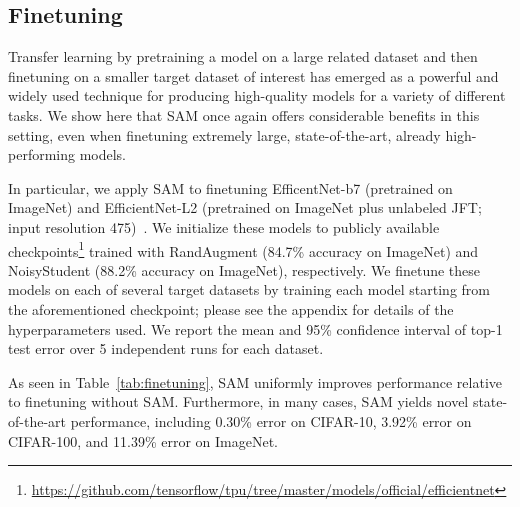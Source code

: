 \documentclass{article} %
\begin{document}
\subsection{Finetuning}

Transfer learning by pretraining a model on a large related dataset and then finetuning on a smaller target dataset of interest has emerged as a powerful and widely used technique for producing high-quality models for a variety of different tasks.  We show here that SAM once again offers considerable benefits in this setting, even when finetuning extremely large, state-of-the-art, already high-performing models.

In particular, we apply SAM to finetuning EfficentNet-b7 (pretrained on ImageNet) and EfficientNet-L2 (pretrained on ImageNet plus unlabeled JFT; input resolution 475)~\citep{efficientnet, 2018arXiv180508974K, gpipe}.  We initialize these models to publicly available checkpoints\footnote{\url{https://github.com/tensorflow/tpu/tree/master/models/official/efficientnet}} trained with RandAugment (84.7\% accuracy on ImageNet) and NoisyStudent (88.2\% accuracy on ImageNet), respectively.  We finetune these models on each of several target datasets by training each model starting from the aforementioned checkpoint; please see the appendix for details of the hyperparameters used.  We report the mean and 95\% confidence interval of top-1 test error over 5 independent runs for each dataset.

As seen in Table~\ref{tab:finetuning}, SAM uniformly improves performance relative to finetuning without SAM.  Furthermore, in many cases, SAM yields novel state-of-the-art performance, including 0.30\% error on CIFAR-10, 3.92\% error on CIFAR-100, and 11.39\% error on ImageNet.
\end{document}
